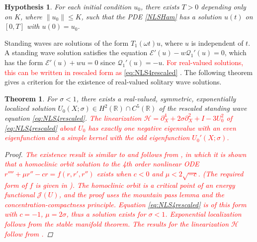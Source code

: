 \documentclass[12pt]{elsarticle}
\def\R{{\mathbb R}}
\def\calH{{\mathcal H}}
\def\calE{{\mathcal E}}
\def\calQ{{\mathcal Q}}
\def\calJ{{\mathcal J}}
\newtheorem{theorem}{Theorem}
\newtheorem{hypothesis}{Hypothesis}
\newcommand{\revised}[1]{ \textcolor{red}{#1} }
\begin{document}
\begin{hypothesis}\label{hyp:wp}
For each initial condition $u_0$, there exists $T > 0$ depending only on $K$, where $\|u_0\| \leq K$, such that the PDE \cref{NLSHam} has a solution $u(t)$ on $[0, T]$ with $u(0) = u_0$.
\end{hypothesis}

Standing waves are solutions of the form $T_1(\omega t) u$, where $u$ is independent of $t$. A standing wave solution satisfies the equation $\calE'(u) - w \calQ_1'(u) = 0$, which has the form $\calE'(u) + w u = 0$ since $\calQ_1'(u) = -u$. \revised{For real-valued solutions, this can be written in rescaled form as \cref{eq:NLS4rescaled}}. The following theorem gives a criterion for the existence of real-valued solitary wave solutions.

\begin{theorem}\label{theorem:solitonexist}
For $\sigma < 1$, there exists a real-valued, symmetric, exponentially localized solution $U_0(X; \sigma) \in H^2(\R) \cap C^5(\R)$ of the rescaled standing wave equation \cref{eq:NLS4rescaled}. \revised{The linearization $\calH = \partial_X^4 + 2 \sigma \partial_X^2 + I - 3 U_0^2$ of \cref{eq:NLS4rescaled} about $U_0$ has exactly one negative eigenvalue with an even eigenfunction and a simple kernel with the odd eigenfunction $U_0'(X; \sigma)$.}

\begin{proof}
\revised{The existence result is similar to \cite[Theorem 2.1(i)]{Pelinovsky2007} and follows from \cite{Groves1998}, in which it is shown that a homoclinic orbit solution to the 4th order nonlinear ODE $r'''' + \mu r'' - cr = f(r, r', r'')$ exists when $c < 0$ and $\mu < 2 \sqrt{-c}$. (The required form of $f$ is given in \cite{Groves1998}). The homoclinic orbit is a critical point of an energy functional $\calJ(U)$, and the proof uses the mountain pass lemma and the concentration-compactness principle. Equation \cref{eq:NLS4rescaled} is of this form with $c = -1$, $\mu = 2 \sigma$, thus a solution exists for $\sigma < 1$. Exponential localization follows from the stable manifold theorem. The results for the linearization $\calH$ follow from \cite[Theorem 2.1(ii)]{Pelinovsky2007}.}
\end{proof}
\end{theorem}
\end{document}
